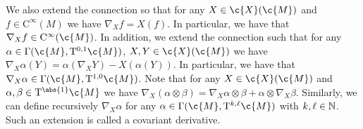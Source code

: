 We also extend the connection so that for any $X \in \c{X}(\c{M})$ and $f \in \mathrm{C}^\infty(M)$ we have $\nabla_X f = X(f)$.
In particular, we have that $\nabla_X f \in \mathrm{C}^\infty(\c{M})$.
In addition, we extend the connection such that for any $\alpha \in \Gamma(\c{M}, \mathrm{T}^{0,1} \c{M})$, $X,Y \in \c{X}(\c{M})$ we have $\nabla_X \alpha (Y) = \alpha(\nabla_X Y) - X(\alpha(Y))$.
In particular, we have that $\nabla_X \alpha \in \Gamma(\c{M}, \mathrm{T}^{1,0} \c{M})$.
Note that for any $X \in \c{X}(\c{M})$ and $\alpha, \beta \in \mathrm{T}^{\abs{1}} \c{M}$ we have $\nabla_X (\alpha \otimes \beta) = \nabla_X \alpha \otimes \beta + \alpha \otimes \nabla_X \beta$.
Similarly, we can define recursively $\nabla_X \alpha$ for any $\alpha \in \Gamma(\c{M}, \mathrm{T}^{k,\ell}\c{M})$ with $k, \ell \in \mathbb{N}$.
Such an extension is called a covariant derivative.

